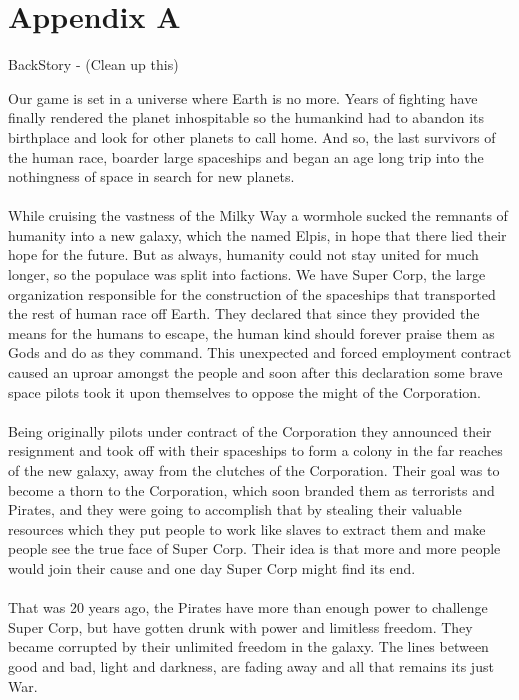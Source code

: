 \documentclass[11pt,a4paper]{article}
\begin{document}
\pagebreak
        \section{Appendix A}

        BackStory - (Clean up this)

        Our game is set in a universe where Earth is no more. Years of fighting have finally rendered the planet inhospitable so the humankind had to abandon its birthplace and look for other planets to call home. And so, the last survivors of the human race, boarder large spaceships and began an age long trip into the nothingness of space in search for new planets. \\\\
        While cruising the vastness of the Milky Way a wormhole sucked the remnants of humanity into a new galaxy, which the named Elpis, in hope that there lied their hope for the future. But as always, humanity could not stay united for much longer, so the populace was split into factions. We have Super Corp, the large organization responsible for the construction of the spaceships that transported the rest of human race off Earth. They declared that since they provided the means for the humans to escape, the human kind should forever praise them as Gods and do as they command. This unexpected and forced employment contract caused an uproar amongst the people and soon after this declaration some brave space pilots took it upon themselves to oppose the might of the Corporation. \\\\

        Being originally pilots under contract of the Corporation they announced their resignment and took off with their spaceships to form a colony in the far reaches of the new galaxy, away from the clutches of the Corporation. Their goal was to become a thorn to the Corporation, which soon branded them as terrorists and Pirates, and they were going to accomplish that by stealing their valuable resources which they put people to work like slaves to extract them and make people see the true face of Super Corp. Their idea is that more and more people would join their cause and one day Super Corp might find its end.
        \\ \\

        That was 20 years ago, the Pirates have more than enough power to challenge Super Corp, but have gotten drunk with power and limitless freedom. They became corrupted by their unlimited freedom in the galaxy. The lines between good and bad, light and darkness, are fading away and all that remains its just War.
\end{document}
